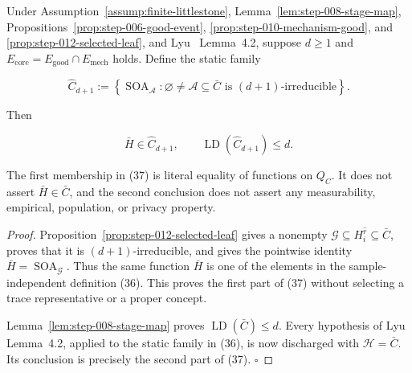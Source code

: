 \begin{proposition}\label{prop:step-012-fixed-family}
Under Assumption~\ref{assump:finite-littlestone},
Lemma~\ref{lem:step-008-stage-map},
Propositions~\ref{prop:step-006-good-event},
\ref{prop:step-010-mechanism-good}, and
\ref{prop:step-012-selected-leaf}, and Lyu~\citep{lyu2025}
Lemma~4.2, suppose \(d\ge1\) and
\(E_{\mathrm{core}}=E_{\mathrm{good}}\cap E_{\mathrm{mech}}\) holds. Define
the static family

\[
 \widehat C_{d+1}
 :=\left\{\operatorname{SOA}_{\mathcal A}:
       \varnothing\ne\mathcal A\subseteq\bar C
       \text{ is }(d+1)\text{-irreducible}\right\}.
\tag{36}
\]

Then

\[
 \bar H\in\widehat C_{d+1},
 \qquad
 \operatorname{LD}(\widehat C_{d+1})\le d.
\tag{37}
\]

The first membership in (37) is literal equality of functions on \(Q_C\).
It does not assert \(\bar H\in\bar C\), and the second conclusion does not
assert any measurability, empirical, population, or privacy property.


\end{proposition}

\begin{proof}
Proposition~\ref{prop:step-012-selected-leaf} gives a nonempty
\(\mathcal G\subseteq H_i^{\widehat r}\subseteq\bar C\), proves that it
is \((d+1)\)-irreducible, and gives the pointwise identity
\(\bar H=\operatorname{SOA}_{\mathcal G}\). Thus the same function
\(\bar H\) is one of the elements in the sample-independent definition
(36). This proves the first part of (37) without selecting a trace
representative or a proper concept.

Lemma~\ref{lem:step-008-stage-map} proves
\(\operatorname{LD}(\bar C)\le d\). Every hypothesis of Lyu~\citep{lyu2025}
Lemma~4.2, applied to the static family in (36), is now discharged with
\(\mathcal H=\bar C\). Its conclusion is precisely the second part of
(37). \(\square\)


\end{proof}

